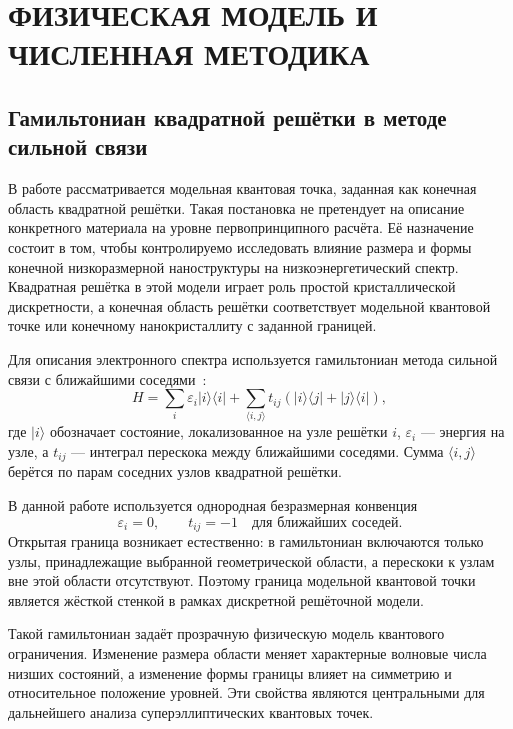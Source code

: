 \chapter{ФИЗИЧЕСКАЯ МОДЕЛЬ И ЧИСЛЕННАЯ МЕТОДИКА}

\section{Гамильтониан квадратной решётки в методе сильной связи}

В работе рассматривается модельная квантовая точка, заданная как конечная область
квадратной решётки. Такая постановка не претендует на описание конкретного материала на
уровне первопринципного расчёта. Её назначение состоит в том, чтобы контролируемо
исследовать влияние размера и формы конечной низкоразмерной наноструктуры на
низкоэнергетический спектр. Квадратная решётка в этой модели играет роль простой
кристаллической дискретности, а конечная область решётки соответствует модельной квантовой
точке или конечному нанокристаллиту с заданной границей.

Для описания электронного спектра используется гамильтониан метода сильной связи с
ближайшими соседями~\cite{slater1954lcao,ashcroft1976solidstate}:
\begin{equation}
  H
  =
  \sum_i \varepsilon_i |i\rangle\langle i|
  +
  \sum_{\langle i,j\rangle}
  t_{ij}
  \left(
    |i\rangle\langle j|
    +
    |j\rangle\langle i|
  \right),
\end{equation}
где $|i\rangle$ обозначает состояние, локализованное на узле решётки $i$, $\varepsilon_i$
--- энергия на узле, а $t_{ij}$ --- интеграл перескока между ближайшими соседями. Сумма
$\langle i,j\rangle$ берётся по парам соседних узлов квадратной решётки.

В данной работе используется однородная безразмерная конвенция
\begin{equation}
  \varepsilon_i = 0,
  \qquad
  t_{ij} = -1
  \quad
  \text{для ближайших соседей}.
\end{equation}
Открытая граница возникает естественно: в гамильтониан включаются только узлы,
принадлежащие выбранной геометрической области, а перескоки к узлам вне этой области
отсутствуют. Поэтому граница модельной квантовой точки является жёсткой стенкой в рамках
дискретной решёточной модели.

Такой гамильтониан задаёт прозрачную физическую модель квантового ограничения. Изменение
размера области меняет характерные волновые числа низших состояний, а изменение формы
границы влияет на симметрию и относительное положение уровней. Эти свойства являются
центральными для дальнейшего анализа суперэллиптических квантовых точек.

